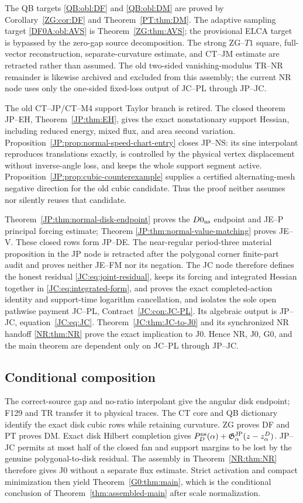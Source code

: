 \documentclass[11pt]{amsart}
\begin{document}
The QB targets \ref{QB:obl:DF} and \ref{QB:obl:DM} are proved by
Corollary~\ref{ZG:cor:DF} and Theorem~\ref{PT:thm:DM}.  The adaptive
sampling target \ref{DF0A:obl:AVS} is Theorem~\ref{ZG:thm:AVS}; the
provisional ELCA target is bypassed by the zero-gap source decomposition.
The strong ZG--$T1$ square, full-vector reconstruction, separate-curvature
estimate, and CT--JM estimate are retracted rather than assumed.
The old two-sided vanishing-modulus TR--NR remainder is likewise archived
and excluded from this assembly; the current NR node uses only the
one-sided fixed-loss output of JC--PL through JP--JC.

The old CT--JP/CT--M4 support Taylor branch is retired.  The closed theorem
JP--EH, Theorem~\ref{JP:thm:EH}, gives the exact nonstationary support
Hessian, including reduced energy, mixed flux, and area second variation.
Proposition~\ref{JP:prop:normal-speed-chart-entry} closes JP--NS: its sine
interpolant reproduces translations exactly, is controlled by the physical
vertex displacement without inverse-angle loss, and keeps the whole
support segment active.
Proposition~\ref{JP:prop:cubic-counterexample} supplies a certified
alternating-mesh negative direction for the old cubic candidate.  Thus the
proof neither assumes nor silently reuses that candidate.

Theorem~\ref{JP:thm:normal-disk-endpoint} proves the $D0_{\rm ns}$ endpoint
and JE--P principal forcing estimate; Theorem
\ref{JP:thm:normal-value-matching} proves JE--V.  These closed rows form
JP--DE.  The near-regular period-three material proposition in the JP node
is retracted after the polygonal corner finite-part audit and proves
neither JE--FM nor its negation.  The JC node
therefore defines the honest residual \ref{JC:eq:joint-residual}, keeps its
forcing and integrated Hessian together in \ref{JC:eq:integrated-form}, and
proves the exact completed-action identity and support-time logarithm
cancellation, and isolates the sole open pathwise payment JC--PL,
Contract~\ref{JC:con:JC-PL}.  Its algebraic output is JP--JC,
equation~\ref{JC:eq:JC}.
Theorem~\ref{JC:thm:JC-to-J0} and its synchronized NR handoff
\ref{NR:thm:NR} prove the exact implication to J0.  Hence NR, J0, G0, and
the main theorem are dependent only on JC--PL through JP--JC.

\subsection{Conditional composition}

The correct-source gap and no-ratio interpolant give the angular disk
endpoint; F129 and TR transfer it to physical traces.  The CT core and QB
dictionary identify the exact disk cubic rows while retaining curvature.
ZG proves DF and PT proves DM.  Exact disk Hilbert completion gives
$P_D^{\rm ns}(\alpha)+\mathfrak G^{\rm JP}_\alpha(z-z_\alpha^D)$.  JP--JC permits at most
half of the closed fan and support margins to be lost by the genuine
polygonal-to-disk residual.  The assembly in Theorem~\ref{NR:thm:NR}
therefore gives J0 without a separate flux estimate.  Strict activation
and compact minimization then yield Theorem~\ref{G0:thm:main}, which is the
conditional conclusion of Theorem~\ref{thm:assembled-main} after scale
normalization.
\end{document}
